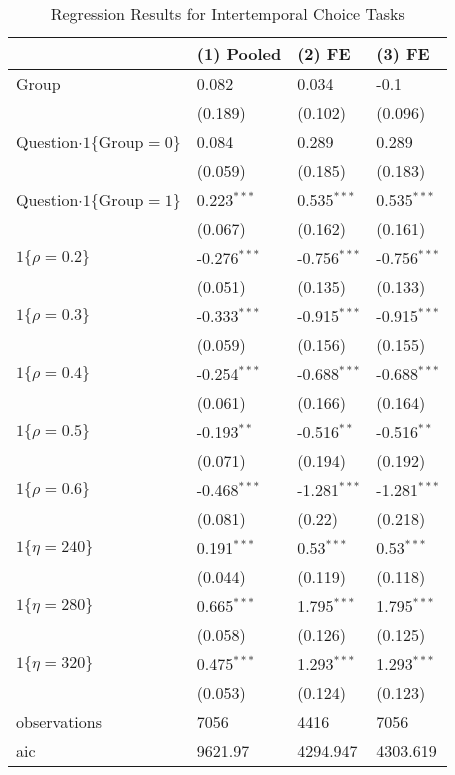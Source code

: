\documentclass[12pt]{article}
\begin{document}
\begin{table}
    \caption{Regression Results for Intertemporal Choice Tasks}
    \vspace*{12pt}
    \centering

      \begin{tabular}{llll}
\hline
 & (1) Pooled & (2) FE & (3) FE \\
\hline
Group & 0.082 & 0.034 & -0.1 \\
 & (0.189) & (0.102) & (0.096) \\
Question$\cdot1\{\text{Group}=0\}$ & 0.084 & 0.289 & 0.289 \\
 & (0.059) & (0.185) & (0.183) \\
Question$\cdot1\{\text{Group}=1\}$ & 0.223$^{***}$ & 0.535$^{***}$ & 0.535$^{***}$ \\
 & (0.067) & (0.162) & (0.161) \\
$1\{\rho=0.2\}$ & -0.276$^{***}$ & -0.756$^{***}$ & -0.756$^{***}$ \\
 & (0.051) & (0.135) & (0.133) \\
$1\{\rho=0.3\}$ & -0.333$^{***}$ & -0.915$^{***}$ & -0.915$^{***}$ \\
 & (0.059) & (0.156) & (0.155) \\
$1\{\rho=0.4\}$ & -0.254$^{***}$ & -0.688$^{***}$ & -0.688$^{***}$ \\
 & (0.061) & (0.166) & (0.164) \\
$1\{\rho=0.5\}$ & -0.193$^{**}$ & -0.516$^{**}$ & -0.516$^{**}$ \\
 & (0.071) & (0.194) & (0.192) \\
$1\{\rho=0.6\}$ & -0.468$^{***}$ & -1.281$^{***}$ & -1.281$^{***}$ \\
 & (0.081) & (0.22) & (0.218) \\
$1\{\eta=240\}$ & 0.191$^{***}$ & 0.53$^{***}$ & 0.53$^{***}$ \\
 & (0.044) & (0.119) & (0.118) \\
$1\{\eta=280\}$ & 0.665$^{***}$ & 1.795$^{***}$ & 1.795$^{***}$ \\
 & (0.058) & (0.126) & (0.125) \\
$1\{\eta=320\}$ & 0.475$^{***}$ & 1.293$^{***}$ & 1.293$^{***}$ \\
 & (0.053) & (0.124) & (0.123) \\\hline

observations & 7056 & 4416 & 7056 \\
aic & 9621.97 & 4294.947 & 4303.619 \\
\hline
\end{tabular}


\end{table}
\end{document}
